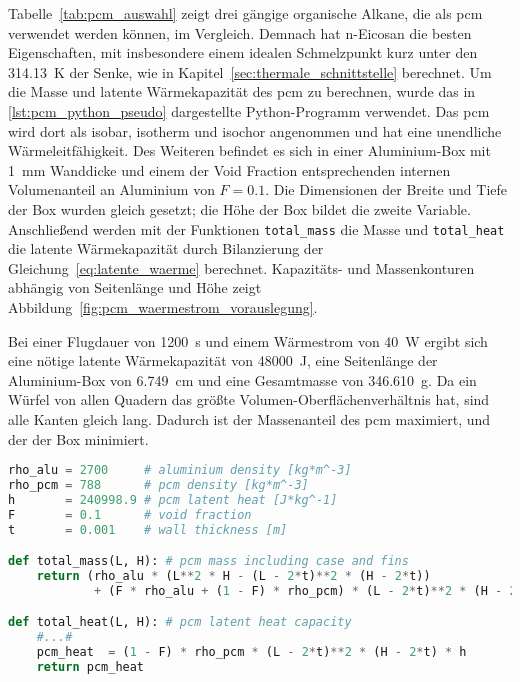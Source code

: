 Tabelle~\ref{tab:pcm_auswahl} zeigt drei gängige organische Alkane, die als \ac{pcm} verwendet werden können, im Vergleich.
Demnach hat n-Eicosan die besten Eigenschaften, mit insbesondere einem idealen Schmelzpunkt kurz unter den \SI{314,13}{\kelvin} der Senke,
wie in Kapitel~\ref{sec:thermale_schnittstelle} berechnet.
Um die Masse und latente Wärmekapazität des \ac{pcm} zu berechnen, wurde das in \ref{lst:pcm_python_pseudo} dargestellte Python-Programm verwendet.
Das \ac{pcm} wird dort als isobar, isotherm und isochor angenommen und hat eine unendliche Wärmeleitfähigkeit. Des Weiteren befindet es sich
in einer Aluminium-Box mit \SI{1}{\milli\meter} Wanddicke und einem der Void Fraction entsprechenden internen Volumenanteil an  Aluminium von $F = 0.1$.
Die Dimensionen der Breite und Tiefe der Box wurden gleich gesetzt; die Höhe der Box bildet die zweite Variable.
Anschließend werden mit der Funktionen \texttt{total\_mass} die Masse und \texttt{total\_heat} die latente Wärmekapazität durch Bilanzierung
der Gleichung~\ref{eq:latente_waerme} berechnet.
Kapazitäts- und Massenkonturen abhängig von Seitenlänge und Höhe zeigt Abbildung~\ref{fig:pcm_waermestrom_vorauslegung}.

Bei einer Flugdauer von \SI{1200}{\second} und einem Wärmestrom von \SI{40}{\watt} ergibt sich eine nötige latente Wärmekapazität von
\SI{48000}{\joule}, eine Seitenlänge der Aluminium-Box von \SI{6,749}{\centi\meter} und eine Gesamtmasse von \SI{346,610}{\gram}.
Da ein Würfel von allen Quadern das größte Volumen-Oberflächenverhältnis hat, sind alle Kanten gleich lang. Dadurch ist der Massenanteil des \ac{pcm}
maximiert, und der der Box minimiert.

\begin{lstlisting}[float, language=Python, caption={Berechnung der Masse und latenten Wärmekapazität des \acs{pcm} in der pcm.py.}, label={lst:pcm_python_pseudo}]
rho_alu = 2700     # aluminium density [kg*m^-3]
rho_pcm = 788      # pcm density [kg*m^-3]
h       = 240998.9 # pcm latent heat [J*kg^-1]
F       = 0.1      # void fraction
t       = 0.001    # wall thickness [m]

def total_mass(L, H): # pcm mass including case and fins
    return (rho_alu * (L**2 * H - (L - 2*t)**2 * (H - 2*t))
            + (F * rho_alu + (1 - F) * rho_pcm) * (L - 2*t)**2 * (H - 2*t)) 

def total_heat(L, H): # pcm latent heat capacity
    #...#
    pcm_heat  = (1 - F) * rho_pcm * (L - 2*t)**2 * (H - 2*t) * h
    return pcm_heat
\end{lstlisting}

